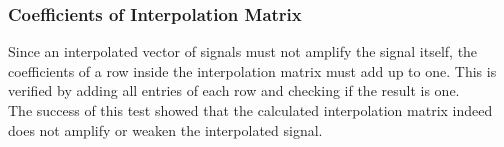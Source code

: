\subsubsection{Coefficients of Interpolation Matrix}

Since an interpolated vector of signals must not amplify the signal itself, the coefficients of a row inside the interpolation matrix must add up to one.
This is verified by adding all entries of each row and checking if the result is one.\\
The success of this test showed that the calculated interpolation matrix indeed does not amplify or weaken the interpolated signal.


